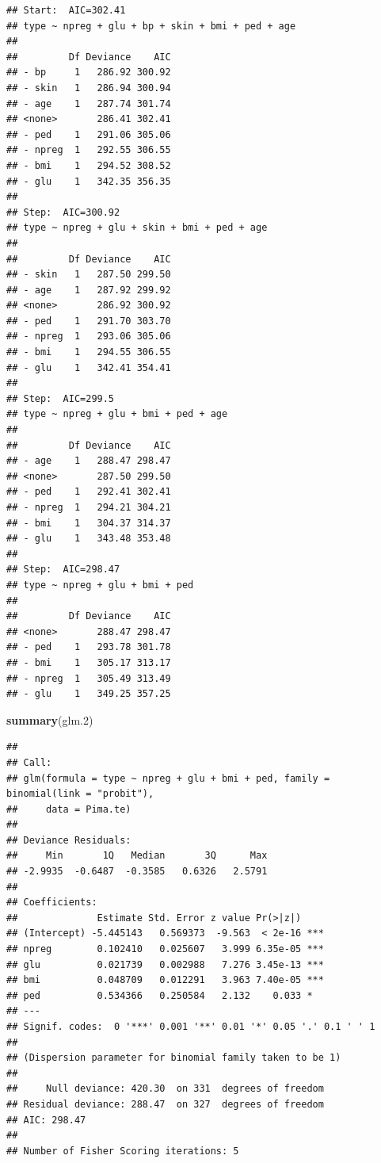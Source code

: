 \documentclass[]{book}
\newenvironment{Shaded}{\begin{snugshade}}{\end{snugshade}}
\newcommand{\FloatTok}[1]{\textcolor[rgb]{0.00,0.00,0.81}{#1}}
\newcommand{\KeywordTok}[1]{\textcolor[rgb]{0.13,0.29,0.53}{\textbf{#1}}}
\newcommand{\NormalTok}[1]{#1}
\theoremstyle{definition}
\theoremstyle{definition}
\theoremstyle{definition}
\theoremstyle{remark}
\begin{document}
\begin{verbatim}
## Start:  AIC=302.41
## type ~ npreg + glu + bp + skin + bmi + ped + age
## 
##         Df Deviance    AIC
## - bp     1   286.92 300.92
## - skin   1   286.94 300.94
## - age    1   287.74 301.74
## <none>       286.41 302.41
## - ped    1   291.06 305.06
## - npreg  1   292.55 306.55
## - bmi    1   294.52 308.52
## - glu    1   342.35 356.35
## 
## Step:  AIC=300.92
## type ~ npreg + glu + skin + bmi + ped + age
## 
##         Df Deviance    AIC
## - skin   1   287.50 299.50
## - age    1   287.92 299.92
## <none>       286.92 300.92
## - ped    1   291.70 303.70
## - npreg  1   293.06 305.06
## - bmi    1   294.55 306.55
## - glu    1   342.41 354.41
## 
## Step:  AIC=299.5
## type ~ npreg + glu + bmi + ped + age
## 
##         Df Deviance    AIC
## - age    1   288.47 298.47
## <none>       287.50 299.50
## - ped    1   292.41 302.41
## - npreg  1   294.21 304.21
## - bmi    1   304.37 314.37
## - glu    1   343.48 353.48
## 
## Step:  AIC=298.47
## type ~ npreg + glu + bmi + ped
## 
##         Df Deviance    AIC
## <none>       288.47 298.47
## - ped    1   293.78 301.78
## - bmi    1   305.17 313.17
## - npreg  1   305.49 313.49
## - glu    1   349.25 357.25
\end{verbatim}

\begin{Shaded}
\begin{Highlighting}[]
\KeywordTok{summary}\NormalTok{(glm}\FloatTok{.2}\NormalTok{)}
\end{Highlighting}
\end{Shaded}

\begin{verbatim}
## 
## Call:
## glm(formula = type ~ npreg + glu + bmi + ped, family = binomial(link = "probit"), 
##     data = Pima.te)
## 
## Deviance Residuals: 
##     Min       1Q   Median       3Q      Max  
## -2.9935  -0.6487  -0.3585   0.6326   2.5791  
## 
## Coefficients:
##              Estimate Std. Error z value Pr(>|z|)    
## (Intercept) -5.445143   0.569373  -9.563  < 2e-16 ***
## npreg        0.102410   0.025607   3.999 6.35e-05 ***
## glu          0.021739   0.002988   7.276 3.45e-13 ***
## bmi          0.048709   0.012291   3.963 7.40e-05 ***
## ped          0.534366   0.250584   2.132    0.033 *  
## ---
## Signif. codes:  0 '***' 0.001 '**' 0.01 '*' 0.05 '.' 0.1 ' ' 1
## 
## (Dispersion parameter for binomial family taken to be 1)
## 
##     Null deviance: 420.30  on 331  degrees of freedom
## Residual deviance: 288.47  on 327  degrees of freedom
## AIC: 298.47
## 
## Number of Fisher Scoring iterations: 5
\end{verbatim}
\end{document}
